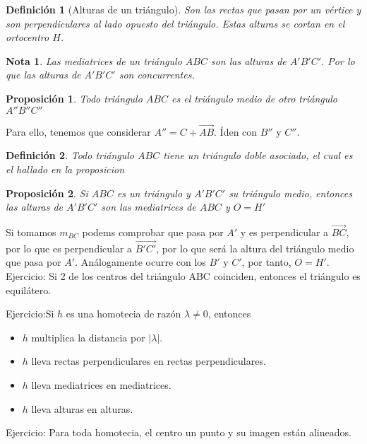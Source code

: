 \documentclass[11pt, a4paper, titlepage]{article}
\makeatletter
\renewenvironment{proof}[1][\proofname] {\vspace{-15pt}\par\pushQED{\qed}\normalfont\topsep6\p@\@plus6\p@\relax\trivlist\item[\hskip\labelsep\it#1\@addpunct{.}]\ignorespaces}{\popQED\endtrivlist\@endpefalse}
\renewcommand{\vec}{\overrightarrow}
\theoremstyle{theorem-style}
\newtheorem*{nprop}{Proposición}
\theoremstyle{definition-style}
\newtheorem*{ndef}{Definición}
\theoremstyle{remark-style}
\newtheorem*{nota}{Nota}
\theoremstyle{example-style}
\makeatother
\begin{document}
\begin{ndef}[Alturas de un triángulo]
	Son las rectas que pasan por un vértice y son perpendiculares al lado opuesto del triángulo. Estas alturas se cortan en el ortocentro $H$.
\end{ndef}

\begin{nota}
	Las mediatrices de un triángulo $ABC$ son las alturas de $A'B'C'$. Por lo que las alturas de $A'B'C'$ son concurrentes.
\end{nota}

\begin{nprop}
	Todo triángulo $ABC$ es el triángulo medio de otro triángulo $A''B''C''$
\end{nprop}
\begin{proof}
	Para ello, tenemos que considerar $A'' = C+ \vec{AB}$. Íden con $B''$ y $C''$.
\end{proof}
\begin{ndef}
	Todo triángulo $ABC$ tiene un triángulo doble asociado, el cual es el hallado en la proposicion 
\end{ndef}


\begin{nprop}
	Si $ABC$ es un triángulo y $A'B'C'$ su triángulo medio, entonces las alturas de $A'B'C'$ son las mediatrices de $ABC$ y $O=H'$
\end{nprop}
\begin{proof}
	Si tomamos $m_{BC}$ podems comprobar que pasa por $A'$ y es perpendicular a $\vec{BC}$, por lo que es perpendicular a $\vec{B'C'}$, por lo que será la altura del triángulo medio que pasa por $A'$. Análogamente ocurre con los $B'$ y $C'$, por tanto, $O=H'$.
\end{proof}
Ejercicio: Si 2 de los centros del triángulo ABC coinciden, entonces el triángulo es equilátero.


Ejercicio:Si $h$ es una homotecia de razón $\lambda\ne 0$, entonces 
\begin{itemize}
	\item $h$ multiplica la distancia por $|\lambda|$.
	\item $h$ lleva rectas perpendiculares en rectas perpendiculares.
	\item $h$ lleva mediatrices en mediatrices.
	\item $h$ lleva alturas en alturas.
\end{itemize}

Ejercicio: Para toda homotecia, el centro un punto y su imagen están alineados.
\end{document}
